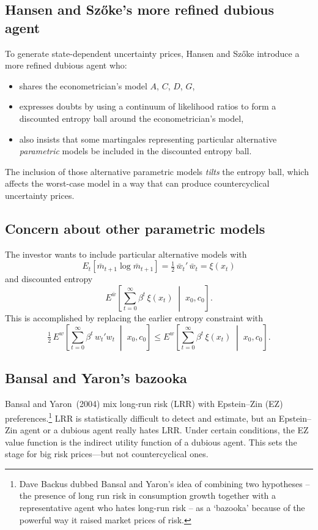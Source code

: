 \documentclass[12pt]{article}
\theoremstyle{definition}
\begin{document}
\subsection{Hansen and Sz\H{o}ke's more refined dubious agent}

To generate state-dependent uncertainty prices, Hansen and Sz\H{o}ke
introduce a more refined dubious agent who:
\begin{itemize}
\item shares the econometrician's model $A$, $C$, $D$, $G$,
\item expresses doubts by using a continuum of likelihood ratios to form
      a discounted entropy ball around the econometrician's model,
\item also insists that some martingales representing particular
      alternative \emph{parametric} models be included in the
      discounted entropy ball.
\end{itemize}
The inclusion of those alternative parametric models \emph{tilts} the
entropy ball, which affects the worst-case model in a way that can
produce countercyclical uncertainty prices.

\subsection{Concern about other parametric models}

The investor wants to include particular alternative models with
\[
   E_t\!\left[\bar m_{t+1}\log\bar m_{t+1}\right]
       = \tfrac{1}{2}\,\bar w_t'\,\bar w_t = \xi(x_t)
\]
and discounted entropy
\[
   E^{\bar w}\!\left[\sum_{t=0}^{\infty} \beta^t\,\xi(x_t)
       \;\middle|\; x_0, c_0\right].
\]
This is accomplished by replacing the earlier entropy constraint with
\begin{equation}
\tfrac{1}{2}\, E^w\!\left[\sum_{t=0}^{\infty} \beta^t\, w_t' w_t
    \;\middle|\; x_0, c_0\right]
    \leq E^w\!\left[\sum_{t=0}^{\infty} \beta^t\,\xi(x_t)
    \;\middle|\; x_0, c_0\right].
\label{eq:tilted-constraint}
\end{equation}

\subsection{Bansal and Yaron's bazooka}

Bansal and Yaron~(2004) mix long-run risk (LRR) with Epstein--Zin (EZ)
preferences.\footnote{Dave Backus dubbed Bansal and Yaron's idea of combining two hypotheses -- the
presence of long run risk in consumption growth together with a representative agent who hates long-run risk --
as a `bazooka' because of the powerful way it raised market prices of risk.}   LRR is statistically difficult to detect and estimate, but
an Epstein--Zin agent or a dubious agent really hates LRR.  Under
certain conditions, the EZ value function is the indirect utility
function of a dubious agent.  This sets the stage for big risk
prices---but not countercyclical ones.
\end{document}
